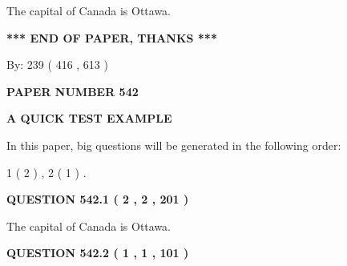\documentclass[12pt]{article}
\begin{document}
 
The capital of Canada is Ottawa.
 
 
 
 
   
   
 \vspace{0.2in}
 
   
   
   
   
\vspace{1.0in} 
{\textbf{\large{ *** END OF PAPER, THANKS *** }}} 
   
   
\hspace{1.0in} By: 
 239 ( 416 ,  613 )
   
   
   
   
\newpage 
\setcounter{page}{ 
   542001 } 
   
   
   
   
 {\textbf{ \Large{ PAPER NUMBER  542  }}}
   
   
\vspace{0.2in}
   
   
   
   
   
   
 \vspace{0.2in}
{\LARGE {\textbf{ A QUICK TEST EXAMPLE}}}
   
   
   
\vspace{0.2in}
   
In this paper, big questions will be generated in the following order: 
   
   
   1 ( 2 )
 ,
   2 ( 1 )
 .
  
\vspace{0.2in}
  
{\textbf{\Large{QUESTION
542.1 
 ( 2 , 2 , 201 )
}}}
  
  
 
 
\noindent{}
 
 
The capital of Canada is Ottawa.
 
 
 
 
  
\vspace{0.2in}
  
{\textbf{\Large{QUESTION
542.2 
 ( 1 , 1 , 101 )
}}}
  
  
 
\end{document}
